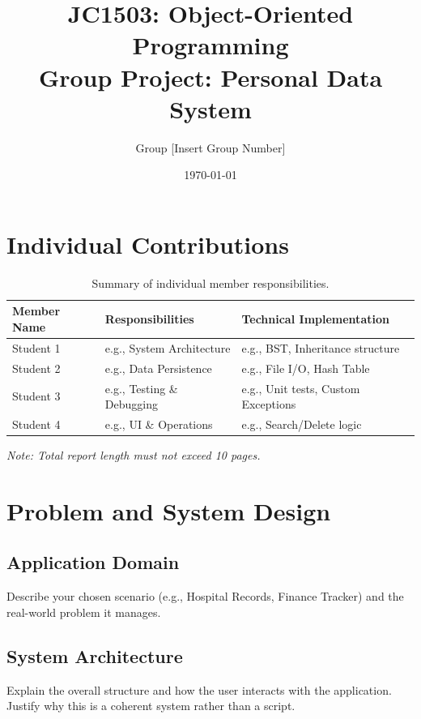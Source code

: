 \documentclass[11pt,a4paper]{article}
\title{JC1503: Object-Oriented Programming \\ \huge Group Project: Personal Data System}
\author{Group [Insert Group Number]}
\date{\today}
\begin{document}
\maketitle

\section*{Individual Contributions}
\begin{table}[h]
    \centering
    \begin{tabular}{lp{6cm}p{5cm}}
        \toprule
        \textbf{Member Name} & \textbf{Responsibilities} & \textbf{Technical Implementation} \\
        \midrule
        Student 1 & e.g., System Architecture & e.g., BST, Inheritance structure \\
        Student 2 & e.g., Data Persistence & e.g., File I/O, Hash Table \\
        Student 3 & e.g., Testing \& Debugging & e.g., Unit tests, Custom Exceptions \\
        Student 4 & e.g., UI \& Operations & e.g., Search/Delete logic \\
        \bottomrule
    \end{tabular}
    \caption{Summary of individual member responsibilities.}
\end{table}

\vfill
\begin{center}
    \textit{Note: Total report length must not exceed 10 pages.}
\end{center}
\newpage

\section{Problem and System Design}
\label{sec:problem_design}

\subsection{Application Domain}
Describe your chosen scenario (e.g., Hospital Records, Finance Tracker) and the real-world problem it manages.

\subsection{System Architecture}
Explain the overall structure and how the user interacts with the application. Justify why this is a coherent system rather than a script.
\end{document}
